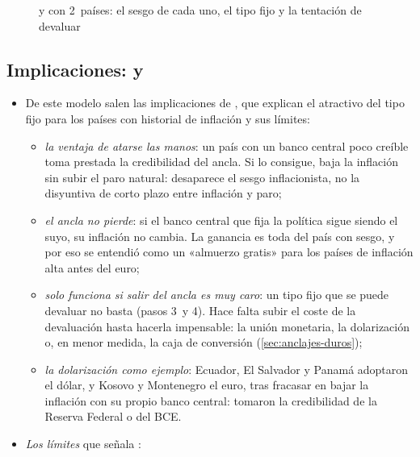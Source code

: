 \documentclass[11pt]{article}
\begin{document}
\begin{figure}[H]
\centering
\caption{ y  con 2~países: el sesgo de cada uno, el tipo fijo y la tentación de devaluar}\label{fig:barro-gordon-abierta}
\end{figure}

\subsection{Implicaciones:  y }

\begin{itemize}
\item De este modelo salen las implicaciones de \textcite{GiavazziPagano1988Advantage}, que explican el atractivo del tipo fijo para los países con historial de inflación y sus límites:
  \begin{itemize}
  \item \emph{la ventaja de atarse las manos}: un país con un banco central poco creíble toma prestada la credibilidad del ancla. Si lo consigue, baja la inflación sin subir el paro natural: desaparece el sesgo inflacionista, no la disyuntiva de corto plazo entre inflación y paro;
  \item \emph{el ancla no pierde}: si el banco central que fija la política sigue siendo el suyo, su inflación no cambia. La ganancia es toda del país con sesgo, y por eso se entendió como un «almuerzo gratis» para los países de inflación alta antes del euro\nocite{DeGrauwe2022Economics};
  \item \emph{solo funciona si salir del ancla es muy caro}: un tipo fijo que se puede devaluar no basta (pasos 3~y 4). Hace falta subir el coste de la devaluación hasta hacerla impensable: la unión monetaria, la dolarización o, en menor medida, la caja de conversión (\ref{sec:anclajes-duros});
  \item \emph{la dolarización como ejemplo}: Ecuador, El Salvador y Panamá adoptaron el dólar, y Kosovo y Montenegro el euro, tras fracasar en bajar la inflación con su propio banco central: tomaron la credibilidad de la Reserva Federal o del BCE.
  \end{itemize}
\item \emph{Los límites} que señala \textcite[cap.~2]{DeGrauwe2022Economics}:

\end{itemize}
\end{document}
